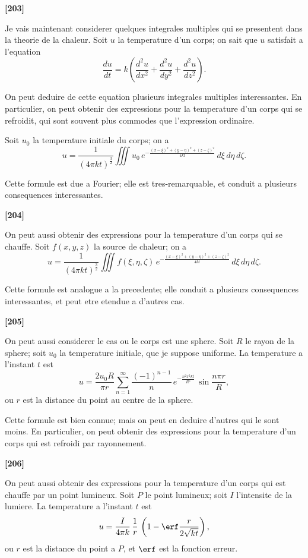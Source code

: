 \documentclass[11pt,a4paper]{book}
\begin{document}
\textbf{[203]}

Je vais maintenant considerer quelques integrales multiples qui se presentent dans
la theorie de la chaleur. Soit $u$ la temperature d'un corps; on sait que $u$ satisfait a
l'equation
\[\frac{du}{dt} = k\left(\frac{d^2u}{dx^2} + \frac{d^2u}{dy^2} + \frac{d^2u}{dz^2}\right).\]

On peut deduire de cette equation plusieurs integrales multiples interessantes. En
particulier, on peut obtenir des expressions pour la temperature d'un corps qui se
refroidit, qui sont souvent plus commodes que l'expression ordinaire.

Soit $u_0$ la temperature initiale du corps; on a
\[u = \frac{1}{(4\pi k t)^{\frac{3}{2}}} \iiint u_0\, e^{-\frac{(x - \xi)^2 + (y - \eta)^2 + (z - \zeta)^2}{4kt}}\, d\xi\, d\eta\, d\zeta.\]

Cette formule est due a Fourier; elle est tres-remarquable, et conduit a plusieurs
consequences interessantes.

\textbf{[204]}

On peut aussi obtenir des expressions pour la temperature d'un corps qui se
chauffe. Soit $f(x, y, z)$ la source de chaleur; on a
\[u = \frac{1}{(4\pi k t)^{\frac{3}{2}}} \iiint f(\xi, \eta, \zeta)\, e^{-\frac{(x - \xi)^2 + (y - \eta)^2 + (z - \zeta)^2}{4kt}}\, d\xi\, d\eta\, d\zeta.\]

Cette formule est analogue a la precedente; elle conduit a plusieurs consequences
interessantes, et peut etre etendue a d'autres cas.

\textbf{[205]}

On peut aussi considerer le cas ou le corps est une sphere. Soit $R$ le rayon de la
sphere; soit $u_0$ la temperature initiale, que je suppose uniforme. La temperature a l'instant
$t$ est
\[u = \frac{2u_0 R}{\pi r} \sum_{n=1}^{\infty} \frac{(-1)^{n-1}}{n}\, e^{-\frac{n^2 \pi^2 k t}{R^2}}\, \sin\frac{n\pi r}{R},\]
ou $r$ est la distance du point au centre de la sphere.

Cette formule est bien connue; mais on peut en deduire d'autres qui le sont moins.
En particulier, on peut obtenir des expressions pour la temperature d'un corps qui est
refroidi par rayonnement.

\textbf{[206]}

On peut aussi obtenir des expressions pour la temperature d'un corps qui est
chauffe par un point lumineux. Soit $P$ le point lumineux; soit $I$ l'intensite de la
lumiere. La temperature a l'instant $t$ est
\[u = \frac{I}{4\pi k}\, \frac{1}{r}\, \left(1 - \erf\frac{r}{2\sqrt{kt}}\right),\]
ou $r$ est la distance du point a $P$, et $\erf$ est la fonction erreur.
\end{document}
